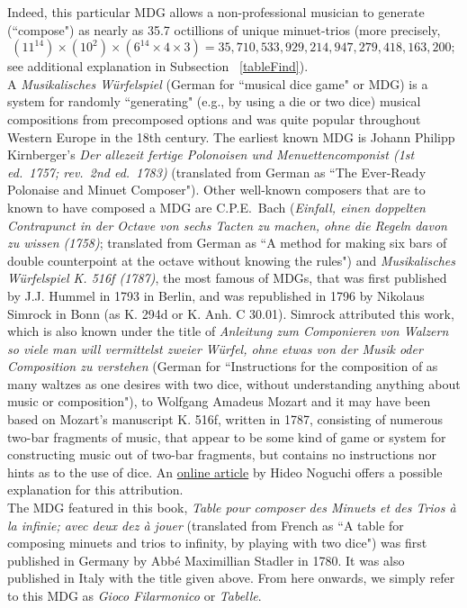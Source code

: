 \documentclass[a4paper,x11names,svgnames,10pt]{article}
\begin{document}
{Indeed, this particular MDG allows a non-professional musician to generate (``compose") as nearly as 35.7 octillions of unique minuet-trios (more precisely, $$(11^{14})\times(10^2)\times(6^{14}\times 4\times 3) = 35,710,533,929,214,947,279,418,163,200;$$ see additional explanation in Subsection ~\ref{tableFind}).\\  

A {\it Musikalisches W\"{u}rfelspiel} (German for ``musical dice game" or MDG) is a system for randomly ``generating" (e.g., by using a die or two dice) musical compositions from precomposed options and was quite popular throughout Western Europe in the 18th century.  The earliest known MDG is Johann Philipp Kirnberger's {\em Der allezeit fertige Polonoisen und Menuettencomponist (1st ed.\ 1757; rev.\ 2nd ed.\ 1783)} (translated from German as ``The Ever-Ready Polonaise and Minuet Composer").  Other well-known composers that are to known to have composed a MDG are C.P.E.\ Bach ({\em Einfall, einen doppelten Contrapunct in der Octave von sechs Tacten zu machen, ohne die Regeln davon zu wissen (1758)}; translated from German as ``A method for making six bars of double counterpoint at the octave without knowing the rules") and {\it Musikalisches W\"{u}rfelspiel K. 516f (1787)}, the most famous of MDGs, that was first published by J.J. Hummel in 1793 in Berlin, and was republished in 1796 by Nikolaus Simrock in Bonn (as K. 294d or K. Anh. C 30.01). Simrock attributed this work, which is also known under the title of {\em Anleitung zum Componieren von Walzern so viele man will vermittelst zweier W\"{u}rfel, ohne etwas von der Musik oder Composition zu verstehen} (German for ``Instructions for the composition of as many waltzes as one desires with two dice, without understanding anything about music or composition"), to Wolfgang Amadeus Mozart and it may have been based on Mozart's manuscript K. 516f, written in 1787, consisting of numerous two-bar fragments of music, that appear to be some kind of game or system for constructing music out of two-bar fragments, but contains no instructions nor hints as to the use of dice.  An \href{(http://www.asahi-net.or.jp/\~rb5h-ngc/e/k516f.htm}{online article} by Hideo Noguchi offers a possible explanation for this attribution. \\

The MDG featured in this book, {\em Table pour composer des Minuets et des Trios \`{a} la infinie; avec deux dez \`{a} jouer} (translated from French as  ``A table for composing minuets and trios to infinity, by playing with two dice") was first published in Germany by Abb\'{e} Maximillian Stadler in 1780. It was also published in Italy with the title given above. From here onwards, we simply refer to this MDG as {\em Gioco Filarmonico} or {\em Tabelle}. \\

}
\end{document}
